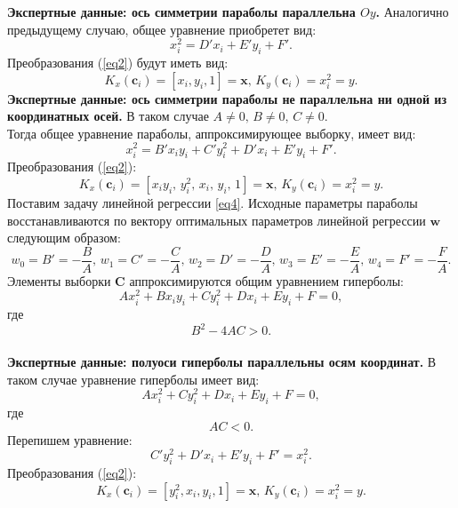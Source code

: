 \documentclass[12pt,twoside]{article}
\begin{document}
\textbf{Экспертные данные: ось симметрии параболы параллельна $Oy$.} 
Аналогично предыдущему случаю, общее уравнение приобретет вид: \begin{equation} x_i^2  = D'x_i + E'y_i + F'.\end{equation}
Преобразования (\ref{eq2}) будут иметь вид: \begin{equation}K_{x}(\mathbf{c}_i) = [x_i, y_i, 1] = \mathbf{x}, \,  K_{y}(\mathbf{c}_i) = x_i^2 = y. \end{equation}
\textbf{Экспертные данные: ось симметрии параболы не параллельна ни одной из координатных осей.} В таком случае $A \neq 0, \, B \neq 0, \, C \neq 0$. \\
Тогда общее уравнение параболы, аппроксимирующее выборку, имеет вид: \begin{equation} x_i^2 = B'x_iy_i + C'y_i^2 + D'x_i + E'y_i + F'.\end{equation}
Преобразования (\ref{eq2}): \begin{equation} K_{x}(\mathbf{c}_i) = [x_iy_i, \, y_i^2, \, x_i, \, y_i, \, 1] = \mathbf{x}, \,  K_{y}(\mathbf{c}_i) = x_i^2 = y.\end{equation}
Поставим задачу линейной регрессии \eqref{eq4}.
Исходные параметры параболы восстанавливаются по вектору оптимальных параметров линейной регрессии $\mathbf{w}$следующим образом: \begin{equation} w_0 = B' = -\frac{B}{A}, \, w_1 = C' = -\frac{C}{A}, \, w_2 = D' = -\frac{D}{A}, \, w_3 = E' = -\frac{E}{A}, \, w_4 = F' = -\frac{F}{A}.\end{equation}
Элементы выборки $\mathbf{C}$ аппроксимируются общим уравнением гиперболы: \begin{equation} Ax_i^2 + Bx_iy_i + Cy_i^2 + Dx_i + Ey_i + F = 0,\end{equation} где \begin{equation} \label{35}
B^2 - 4AC > 0.\end{equation} \\
\textbf{Экспертные данные: полуоси гиперболы параллельны осям координат.} В таком случае уравнение гиперболы имеет вид: \begin{equation}  Ax_i^2 + Cy_i^2 + Dx_i + Ey_i + F = 0,\end{equation} где \begin{equation} \label{37}
AC < 0.\end{equation} Перепишем уравнение: \begin{equation}
C'y_i^2 + D'x_i + E'y_i + F' = x_i^2.\end{equation} Преобразования (\ref{eq2}): \begin{equation}
K_{x}(\mathbf{c}_i) = [y_i^2, x_i, y_i, 1] = \mathbf{x}, \,  K_{y}(\mathbf{c}_i) = x_i^2 = y.\end{equation} \\
\end{document}
